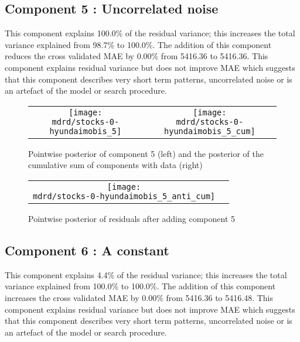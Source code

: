 \documentclass{article} %
\begin{document}
\subsection{Component 5 : Uncorrelated noise}



This component explains 100.0\% of the residual variance; this increases the total variance explained from 98.7\% to 100.0\%.
The addition of this component reduces the cross validated MAE by 0.00\% from 5416.36 to 5416.36.
This component explains residual variance but does not improve MAE which suggests that this component describes very short term patterns, uncorrelated noise or is an artefact of the model or search procedure.

\begin{figure}[H]
\newcommand{\wmgd}{0.5\columnwidth}
\newcommand{\hmgd}{3.0cm}
\newcommand{\mdrd}{stocks-0-hyundaimobis}
\newcommand{\mbm}{\hspace{-0.3cm}}
\begin{tabular}{cc}
\mbm \texttt{[image: \\mdrd/stocks-0-hyundaimobis\_5]} & \texttt{[image: \\mdrd/stocks-0-hyundaimobis\_5\_cum]}
\end{tabular}
\caption{Pointwise posterior of component 5 (left) and the posterior of the cumulative sum of components with data (right)}
\label{fig:comp5}
\end{figure}

\begin{figure}[H]
\newcommand{\wmgd}{0.5\columnwidth}
\newcommand{\hmgd}{3.0cm}
\newcommand{\mdrd}{stocks-0-hyundaimobis}
\newcommand{\mbm}{\hspace{-0.3cm}}
\begin{tabular}{cc}
\mbm \texttt{[image: \\mdrd/stocks-0-hyundaimobis\_5\_anti\_cum]}
\end{tabular}
\caption{Pointwise posterior of residuals after adding component 5}
\label{fig:comp5}
\end{figure}

\subsection{Component 6 : A constant}



This component explains 4.4\% of the residual variance; this increases the total variance explained from 100.0\% to 100.0\%.
The addition of this component increases the cross validated MAE by 0.00\% from 5416.36 to 5416.48.
This component explains residual variance but does not improve MAE which suggests that this component describes very short term patterns, uncorrelated noise or is an artefact of the model or search procedure.
\end{document}
